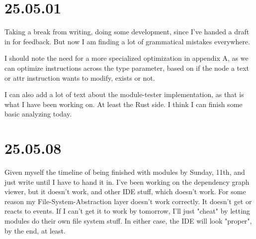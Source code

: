 \section{25.05.01}

Taking a break from writing, doing some development, since I've handed a draft
in for feedback. But now I am finding a lot of grammatical mistakes everywhere.

I should note the need for a more specialized optimization in appendix A, as
we can optimize instructions across the type parameter, based on if the node a
text or attr instruction wants to modify, exists or not.

I can also add a lot of text about the module-tester implementation, as that is
what I have been working on. At least the Rust side. I think I can finish some
basic analyzing today.

\section{25.05.08}

Given myself the timeline of being finished with modules by Sunday, 11th, and
just write until I have to hand it in. I've been working on the dependency graph
viewer, but it doesn't work, and other IDE stuff, which doesn't work. For some
reason my File-System-Abstraction layer doesn't work correctly. It doesn't get
or reacts to events. If I can't get it to work by tomorrow, I'll just "cheat" by
letting modules do their own file system stuff. In either case, the IDE will
look "proper", by the end, at least.
